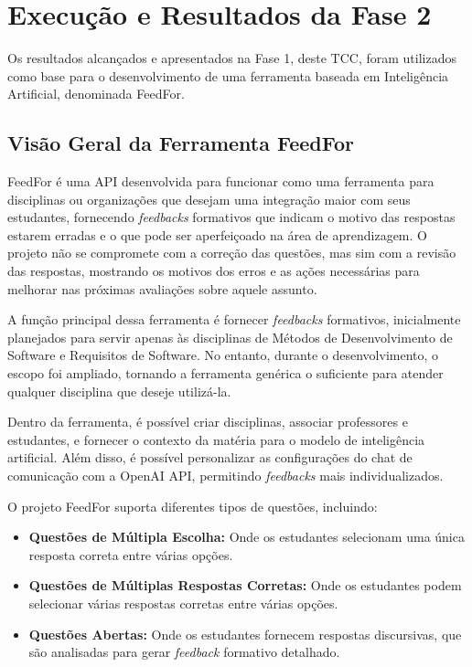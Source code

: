 \chapter{Execução e Resultados da Fase 2}

Os resultados alcançados e apresentados na Fase 1, deste TCC, foram utilizados como base para o desenvolvimento de uma ferramenta baseada em Inteligência Artificial, denominada FeedFor. 

\section{Visão Geral da Ferramenta FeedFor}

FeedFor é uma API desenvolvida para funcionar como uma ferramenta para disciplinas ou organizações que desejam uma integração maior com seus estudantes, fornecendo \textit{\textit{feedbacks}} formativos que indicam o motivo das respostas estarem erradas e o que pode ser aperfeiçoado na área de aprendizagem. O projeto não se compromete com a correção das questões, mas sim com a revisão das respostas, mostrando os motivos dos erros e as ações necessárias para melhorar nas próximas avaliações sobre aquele assunto.

A função principal dessa ferramenta é fornecer \textit{\textit{feedbacks}} formativos, inicialmente planejados para servir apenas às disciplinas de Métodos de Desenvolvimento de Software e Requisitos de Software. No entanto, durante o desenvolvimento, o escopo foi ampliado, tornando a ferramenta genérica o suficiente para atender qualquer disciplina que deseje utilizá-la.

Dentro da ferramenta, é possível criar disciplinas, associar professores e estudantes, e fornecer o contexto da matéria para o modelo de inteligência artificial. Além disso, é possível personalizar as configurações do chat de comunicação com a OpenAI API, permitindo \textit{\textit{feedbacks}} mais individualizados.

O projeto FeedFor suporta diferentes tipos de questões, incluindo:

\begin{itemize}
    \item \textbf{Questões de Múltipla Escolha:} Onde os estudantes selecionam uma única resposta correta entre várias opções.
    \item \textbf{Questões de Múltiplas Respostas Corretas:} Onde os estudantes podem selecionar várias respostas corretas entre várias opções.
    \item \textbf{Questões Abertas:} Onde os estudantes fornecem respostas discursivas, que são analisadas para gerar \textit{feedback} formativo detalhado.
\end{itemize}

